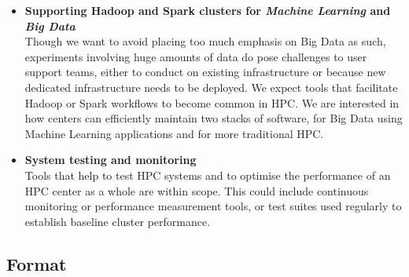 \documentclass[a4paper,10pt]{article}
\begin{document}
\begin{itemize}

    \item \textbf{Supporting Hadoop and Spark clusters for \emph{Machine Learning} and \emph{Big Data}}\\
    Though we want to avoid placing too much emphasis on Big Data as such, 
    experiments involving huge amounts of data do pose challenges to user
    support teams, either to conduct on existing infrastructure or because new 
    dedicated infrastructure needs to be deployed. We expect tools that
    facilitate Hadoop or Spark workflows to become common in HPC. We are 
    interested in how centers can efficiently maintain two stacks of software,
    for Big Data using Machine Learning applications and for more traditional HPC.



    \item \textbf{System testing and monitoring}\\
    Tools that help to test HPC systems and to optimise the performance of an HPC center
    as a whole are within scope.  This could include continuous monitoring or
    performance measurement tools, or test suites used regularly to establish baseline 
    cluster performance.
\end{itemize}


\newpage
\subsection*{Format}
\label{format}
\end{document}
